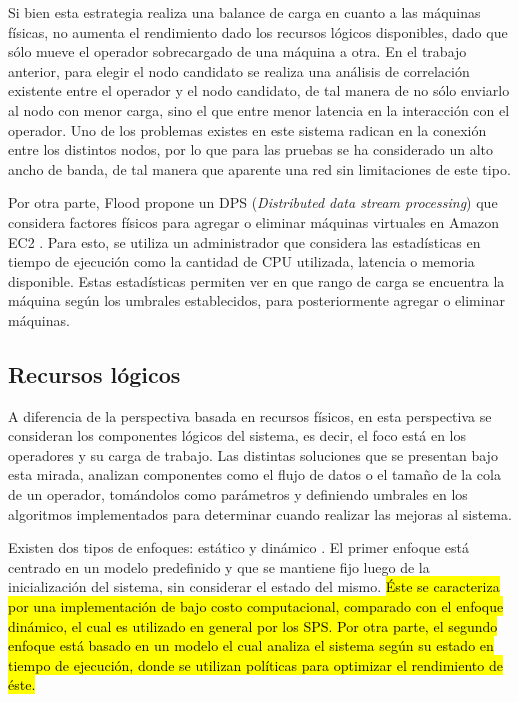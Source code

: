 Si bien esta estrategia realiza una balance de carga en cuanto a las máquinas físicas, no aumenta el rendimiento dado los recursos lógicos disponibles, dado que sólo mueve el operador sobrecargado de una máquina a otra. En el trabajo anterior, para elegir el nodo candidato se realiza una análisis de correlación existente entre el operador y el nodo candidato, de tal manera de no sólo enviarlo al nodo con menor carga, sino el que entre menor latencia en la interacción con el operador. Uno de los problemas existes en este sistema radican en la conexión entre los distintos nodos, por lo que para las pruebas se ha considerado un alto ancho de banda, de tal manera que aparente una red sin limitaciones de este tipo.

Por otra parte, Flood \citep{Alves2010flood} propone un DPS (\textit{Distributed data stream processing}) que considera factores físicos para agregar o eliminar máquinas virtuales en Amazon EC2 \citep{amazonec2}. Para esto, se utiliza un administrador que considera las estadísticas en tiempo de ejecución como la cantidad de CPU utilizada, latencia o memoria disponible. Estas estadísticas permiten ver en que rango de carga se encuentra la máquina según los umbrales establecidos, para posteriormente agregar o eliminar máquinas.

\subsection{Recursos lógicos}
\label{subsec:recLogicosBC}

A diferencia de la perspectiva basada en recursos físicos, en esta perspectiva se consideran los componentes lógicos del sistema, es decir, el foco está en los operadores y su carga de trabajo. Las distintas soluciones que se presentan bajo esta mirada, analizan componentes como el flujo de datos o el tamaño de la cola de un operador, tomándolos como parámetros y definiendo umbrales en los algoritmos implementados para determinar cuando realizar las mejoras al sistema.


Existen dos tipos de enfoques: estático y dinámico \citep{Gupta99loadsharing}. El primer enfoque está centrado en un modelo predefinido y que se mantiene fijo luego de la inicialización del sistema, sin considerar el estado del mismo. \hl{Éste se caracteriza por una implementación de bajo costo computacional, comparado con el enfoque dinámico, el cual es utilizado en general por los SPS. Por otra parte, el segundo enfoque está basado en un modelo el cual analiza el sistema según su estado en tiempo de ejecución, donde se utilizan políticas para optimizar el rendimiento de éste.}

